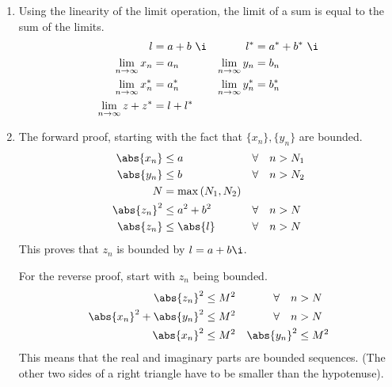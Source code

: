 \begin{enumerate}
    \item Using the linearity of the limit operation, the limit of a sum is equal to
          the sum of the limits.
          \begin{align}
              l                           & = a + b\ \i     &
              l^*                         & = a^* + b^*\ \i   \\
              \lim_{n \to \infty} x_n     & = a_n           &
              \lim_{n \to \infty} y_n     & = b_n             \\
              \lim_{n \to \infty} x_n^*   & = a_n^*         &
              \lim_{n \to \infty} y_n^*   & = b_n^*           \\
              \lim_{n \to \infty} z + z^* & = l + l^*
          \end{align}

    \item The forward proof, starting with the fact that $ \{x_n\}, \{y_n\} $
          are bounded.
          \begin{align}
              \abs{x_n}       & \leq a             &
              \forall \quad n & > N_1                \\
              \abs{y_n}       & \leq b             &
              \forall \quad n & > N_2                \\
              N               & = \max{(N_1, N_2)}   \\
              \abs{z_n}^2     & \leq a^2 + b^2     &
              \forall \quad n & > N                  \\
              \abs{z_n}       & \leq \abs{l}       &
              \forall \quad n & > N
          \end{align}
          This proves that $ z_n $ is bounded by $ l = a + b\i $. \par
          For the reverse proof, start with $ z_n $ being bounded.
          \begin{align}
              \abs{z_n}^2               & \leq M^2 &
              \forall \quad n           & > N        \\
              \abs{x_n}^2 + \abs{y_n}^2 & \leq M^2 &
              \forall \quad n           & > N        \\
              \abs{x_n}^2               & \leq M^2 &
              \abs{y_n}^2               & \leq M^2
          \end{align}
          This means that the real and imaginary parts are bounded sequences.
          (The other two sides of a right triangle have to be smaller than the
          hypotenuse).


\end{enumerate}

